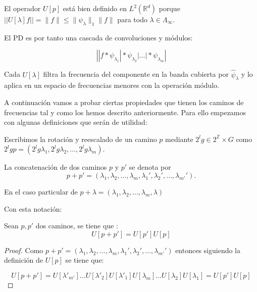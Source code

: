 \noindent El operador $U[p]$ está bien definido en $L^2(\mathbb{R}^d)$ porque $\left|\left| U[\lambda]f \right|\right| = \|f\| \leq \|\psi_\lambda\|_1 \|f\|$ para todo $\lambda \in \Lambda_\infty$. 

\noindent El PD es por tanto una cascada de convoluciones y módulos: 

\begin{equation}
  \left| |f \ast \psi_{\lambda_1} | \ast \psi_{\lambda_2} | \ldots | \ast \psi_{\lambda_m} \right|  
\end{equation}

\medskip

\noindent Cada $U[\lambda]$ filtra la frecuencia del componente en la banda cubierta por $\widehat{\psi}_\lambda$ y lo aplica en un espacio de frecuencias menores con la operación módulo.

\noindent A continuación vamos a probar ciertas propiedades que tienen los caminos de frecuencias tal y como los hemos descrito anteriormente. Para ello empezamos con algunas definiciones que serán de utilidad:

\begin{definicion}
Escribimos la rotación y reescalado de un camino $p$ mediante $2^lg \in 2^\mathbb{Z}\times G$ como $2^lgp=(2^lg\lambda_1,2^lg\lambda_2,\ldots,2^lg\lambda_m)$.
\end{definicion}

\begin{definicion}
La concatenación de dos caminos $p$ y $p'$ se denota por $$p+p'=(\lambda_1,\lambda_2,\ldots,\lambda_m,\lambda_1',\lambda_2',\ldots,\lambda_{m'}').$$

\noindent En el caso particular de $p+\lambda=(\lambda_1,\lambda_2,\ldots,\lambda_m,\lambda)$
\end{definicion}

\noindent Con esta notación: 

\begin{proposicion} \label{proposicionSumaCaminos}
Sean $p, p'$ dos caminos, se tiene que :
$$U[p+p']=U[p']U[p]$$
\end{proposicion}

\begin{proof}
Como $p+p'=(\lambda_1,\lambda_2,...,\lambda_m,\lambda_1',\lambda_2',...,\lambda_{m'}')$ entonces siguiendo la definición de $U[p]$ se tiene que: 

\begin{equation}
  U[p+p']=U[\lambda'_{m'}]\ldots U[\lambda'_2]U[\lambda'_1]U[\lambda_{m}]\ldots U[\lambda_2]U[\lambda_1]=U[p']U[p] 
\end{equation}
\end{proof}

